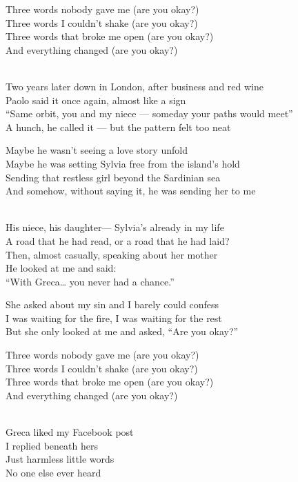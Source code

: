 \begin{lyrics}
Three words nobody gave me (are you okay?)\\
Three words I couldn't shake (are you okay?)\\
Three words that broke me open (are you okay?)\\
And everything changed (are you okay?)

\\
Two years later down in London, after business and red wine\\
Paolo said it once again, almost like a sign\\
“Same orbit, you and my niece — someday your paths would meet”\\
A hunch, he called it — but the pattern felt too neat

Maybe he wasn't seeing a love story unfold\\
Maybe he was setting Sylvia free from the island's hold\\
Sending that restless girl beyond the Sardinian sea\\
And somehow, without saying it, he was sending her to me

\\
His niece, his daughter— Sylvia’s already in my life\\
A road that he had read, or a road that he had laid?\\
Then, almost casually, speaking about her mother\\
He looked at me and said:
\\
“With Greca… you never had a chance.”

She asked about my sin and I barely could confess\\
I was waiting for the fire, I was waiting for the rest\\
But she only looked at me and asked, “Are you okay?”

Three words nobody gave me (are you okay?)\\
Three words I couldn't shake (are you okay?)\\
Three words that broke me open (are you okay?)\\
And everything changed (are you okay?)

\\
Greca liked my Facebook post\\
I replied beneath hers\\
Just harmless little words\\
No one else ever heard


\end{lyrics}
